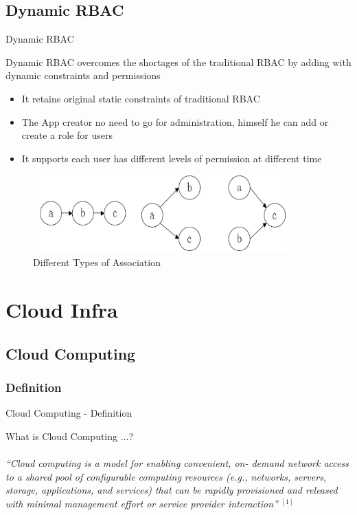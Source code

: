 \documentclass[xcolor=dvipsnames]{beamer}
\begin{document}
\subsection{Dynamic RBAC}
\begin{frame}{Dynamic RBAC}

Dynamic RBAC overcomes the shortages of the traditional RBAC by adding with dynamic constraints and  permissions
\begin{itemize}
 \item It retains original static constraints of traditional RBAC
 \item The App creator no need to go for administration, himself he can add or create a role for users
 \item It supports each user has different levels of permission at different time
\end{itemize}
\begin{figure}[H]
\includegraphics[width=10cm,height=3cm]{ass}
\caption{Different Types of Association}
\end{figure}
\end{frame}
\section{Cloud Infra}
\subsection{Cloud Computing}
\subsubsection{Definition  }
\begin{frame}{Cloud Computing - Definition }

What is Cloud Computing ...? \\
\hspace{4cm} \\
\textit{``Cloud computing is a model for enabling convenient, on-
demand network access to a shared pool of configurable
computing resources (e.g., networks, servers, storage,
applications, and services) that can be rapidly provisioned
and released with minimal management effort or service
provider interaction''} $ ^{[1]} $

\end{frame}
\end{document}
